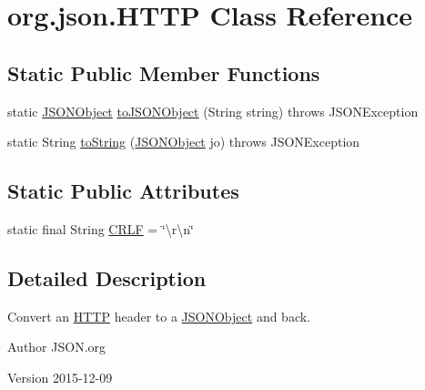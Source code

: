 \hypertarget{classorg_1_1json_1_1HTTP}{\section{org.\-json.\-H\-T\-T\-P Class Reference}
\label{classorg_1_1json_1_1HTTP}
}
\subsection*{Static Public Member Functions}
\begin{DoxyCompactItemize}
\item 
static \hyperlink{classorg_1_1json_1_1JSONObject}{J\-S\-O\-N\-Object} \hyperlink{classorg_1_1json_1_1HTTP_a9ac2cf295e6a84bfeed1af10dc9dae33}{to\-J\-S\-O\-N\-Object} (String string)  throws J\-S\-O\-N\-Exception 
\item 
static String \hyperlink{classorg_1_1json_1_1HTTP_aee0416336b82e1c7c7941350a2a409d7}{to\-String} (\hyperlink{classorg_1_1json_1_1JSONObject}{J\-S\-O\-N\-Object} jo)  throws J\-S\-O\-N\-Exception 
\end{DoxyCompactItemize}
\subsection*{Static Public Attributes}
\begin{DoxyCompactItemize}
\item 
static final String \hyperlink{classorg_1_1json_1_1HTTP_a7feb3304ccde0415ee29b8f997fb65b6}{C\-R\-L\-F} = \char`\"{}\textbackslash{}r\textbackslash{}n\char`\"{}
\end{DoxyCompactItemize}


\subsection{Detailed Description}
Convert an \hyperlink{classorg_1_1json_1_1HTTP}{H\-T\-T\-P} header to a \hyperlink{classorg_1_1json_1_1JSONObject}{J\-S\-O\-N\-Object} and back. \begin{DoxyAuthor}{Author}
J\-S\-O\-N.\-org 
\end{DoxyAuthor}
\begin{DoxyVersion}{Version}
2015-\/12-\/09 
\end{DoxyVersion}


